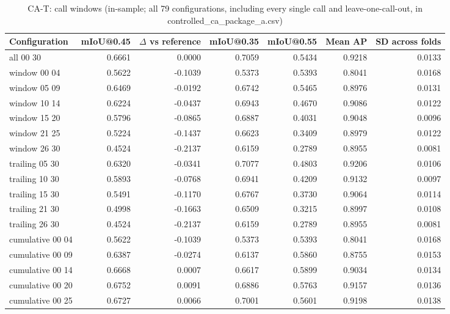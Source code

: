 \begin{table}[H]\centering\scriptsize\setlength{\tabcolsep}{3pt}
\begin{tabular}{>{\raggedright\arraybackslash}p{3.22cm}rrrrrr}
\toprule
Configuration & mIoU@0.45 & $\Delta$ vs reference & mIoU@0.35 & mIoU@0.55 & Mean AP & SD across folds \\
\midrule
all 00 30 & 0.6661 & 0.0000 & 0.7059 & 0.5434 & 0.9218 & 0.0133 \\
window 00 04 & 0.5622 & -0.1039 & 0.5373 & 0.5393 & 0.8041 & 0.0168 \\
window 05 09 & 0.6469 & -0.0192 & 0.6742 & 0.5465 & 0.8976 & 0.0131 \\
window 10 14 & 0.6224 & -0.0437 & 0.6943 & 0.4670 & 0.9086 & 0.0122 \\
window 15 20 & 0.5796 & -0.0865 & 0.6887 & 0.4031 & 0.9048 & 0.0096 \\
window 21 25 & 0.5224 & -0.1437 & 0.6623 & 0.3409 & 0.8979 & 0.0122 \\
window 26 30 & 0.4524 & -0.2137 & 0.6159 & 0.2789 & 0.8955 & 0.0081 \\
trailing 05 30 & 0.6320 & -0.0341 & 0.7077 & 0.4803 & 0.9206 & 0.0106 \\
trailing 10 30 & 0.5893 & -0.0768 & 0.6941 & 0.4209 & 0.9132 & 0.0097 \\
trailing 15 30 & 0.5491 & -0.1170 & 0.6767 & 0.3730 & 0.9064 & 0.0114 \\
trailing 21 30 & 0.4998 & -0.1663 & 0.6509 & 0.3215 & 0.8997 & 0.0108 \\
trailing 26 30 & 0.4524 & -0.2137 & 0.6159 & 0.2789 & 0.8955 & 0.0081 \\
cumulative 00 04 & 0.5622 & -0.1039 & 0.5373 & 0.5393 & 0.8041 & 0.0168 \\
cumulative 00 09 & 0.6387 & -0.0274 & 0.6137 & 0.5860 & 0.8755 & 0.0153 \\
cumulative 00 14 & 0.6668 & 0.0007 & 0.6617 & 0.5899 & 0.9034 & 0.0134 \\
cumulative 00 20 & 0.6752 & 0.0091 & 0.6886 & 0.5763 & 0.9157 & 0.0136 \\
cumulative 00 25 & 0.6727 & 0.0066 & 0.7001 & 0.5601 & 0.9198 & 0.0138 \\
\bottomrule
\end{tabular}
\caption{CA-T: call windows (in-sample; all 79 configurations, including every single call and leave-one-call-out, in controlled\_\allowbreak{}ca\_\allowbreak{}package\_\allowbreak{}a.csv)}\label{tab:a2_ca_t}
\end{table}

